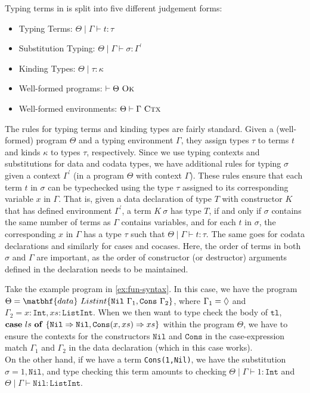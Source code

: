 Typing terms in \surfacelang{} is split into five different judgement forms:
\begin{itemize}
  \item Typing Terms: $\Theta\mid\Gamma\vdash t:\tau$
  \item Substitution Typing: $\Theta\mid\Gamma\vdash\sigma:\Gamma^{\prime}$
  \item Kinding Types: $\Theta\mid\tau:\kappa$
  \item Well-formed programs: $\vdash \Theta\ \textsc{Ok}$
  \item Well-formed environments: $\Theta\vdash \Gamma\ \textsc{Ctx}$
\end{itemize}
The rules for typing terms and kinding types are fairly standard. 
Given a (well-formed) program $\Theta$ and a typing environment $\Gamma$, they assign types $\tau$ to terms $t$ and kinds $\kappa$ to types $\tau$, respectively. 
Since we use typing contexts and substitutions for data and codata types, we have additional rules for typing $\sigma$ given a context $\Gamma^{\prime}$ (in a program $\Theta$ with context $\Gamma$).
These rules ensure that each term $t$ in $\sigma$ can be typechecked using the type $\tau$ assigned to its corresponding variable $x$ in $\Gamma$. 
That is, given a data declaration of type $T$ with constructor $K$ that has defined environment $\Gamma^{\prime}$, a term $K\ \sigma$ has type $T$, if and only if $\sigma$ contains the same number of terms as $\Gamma$ contains variables, and for each $t$ in $\sigma$, the corresponding $x$ in $\Gamma$ has a type $\tau$ such that $\Theta\mid\Gamma\vdash t:\tau$. 
The same goes for codata declarations and similarly for cases and cocases.
Here, the order of terms in both $\sigma$ and $\Gamma$ are important, as the order of constructor (or destructor) arguments defined in the declaration needs to be maintained.
\begin{example}
  Take the example program in \cref{ex:fun-syntax}. 
  In this case, we have the program $\Theta= \matbhf{data}\ Listint\{\mathtt{Nil}\ \Gamma_1, \mathtt{Cons}\ \Gamma_2\}$, where $\Gamma_1=\Diamond$ and $\Gamma_2 = x:\mathtt{Int}, xs:\mathtt{ListInt}$.
  When we then want to type check the body of $\mathtt{tl}$, $\mathbf{case}\ ls\ \mathbf{of}\ \{ \mathtt{Nil}\Rightarrow\mathtt{Nil}, \mathtt{Cons}(x,xs)\Rightarrow xs \}$ within the program $\Theta$, we have to ensure the contexts for the constructors $\mathtt{Nil}$ and $\mathtt{Cons}$ in the case-expression match $\Gamma_1$ and $\Gamma_2$ in the data declaration (which in this case works).\\
  On the other hand, if we have a term \lstinline{Cons(1,Nil)}, we have the substitution $\sigma = 1,\mathtt{Nil}$, and type checking this term amounts to checking $\Theta\mid\Gamma \vdash 1:\mathtt{Int}$ and $\Theta\mid\Gamma\vdash \mathtt{Nil}:\mathtt{ListInt}$.
\end{example}

